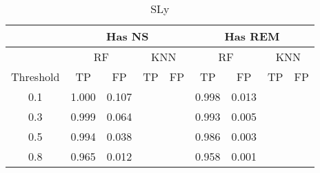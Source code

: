 \begin{table}[]
\centering
\begin{tabular}{@{}c|cccc|cccc@{}}
\toprule
\multicolumn{1}{l|}{}          & \multicolumn{4}{c|}{Has NS}                       & \multicolumn{4}{c}{Has REM}                      \\ \midrule
                               & \multicolumn{2}{c}{RF} & \multicolumn{2}{c|}{KNN} & \multicolumn{2}{c}{RF} & \multicolumn{2}{c}{KNN} \\
\multicolumn{1}{l|}{Threshold} & TP         & FP        & TP          & FP         & TP         & FP        & TP         & FP         \\ \midrule
0.1                            & 1.000      & 0.107     &             &            & 0.998      & 0.013     &            &            \\
0.3                            & 0.999      & 0.064     &             &            & 0.993      & 0.005     &            &            \\
0.5                            & 0.994      & 0.038     &             &            & 0.986      & 0.003     &            &            \\
0.8                            & 0.965      & 0.012     &             &            & 0.958      & 0.001     &            &            \\ \bottomrule
\end{tabular}
\caption{SLy}
\label{tab:my-table}
\end{table}
